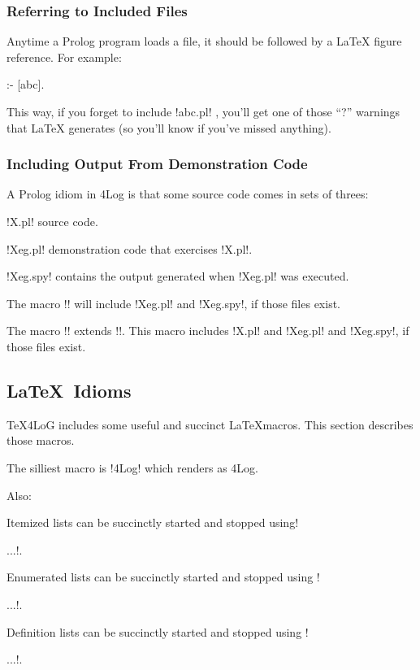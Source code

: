 \subsubsection{Referring to Included Files}

Anytime a Prolog program loads a file, it should be followed by a
{\LaTeX} figure reference. For example:
\newcommand{\bslash}{$\backslash$}

\bl
:- [abc]. %
\el

This way, if you forget to include !abc.pl! , you'll get one of those
``?'' warnings that {\LaTeX} generates (so you'll know if you've
missed anything).

\subsubsection{Including Output From Demonstration Code}

A Prolog idiom in \Tex4Log
is that some source code comes in sets of threes:
\be
\item !X.pl!
source code.
\item
  !Xeg.pl! demonstration code that exercises
!X.pl!.
\item
!Xeg.spy! contains the output generated when !Xeg.pl! was
executed.
\ee

The macro !! will include !Xeg.pl! and
!Xeg.spy!, if those files exist.

The macro !! extends !!.
This macro includes !X.pl! and
!Xeg.pl! and
!Xeg.spy!, if those files exist.



\subsection{\LaTeX~Idioms}

\TeX4LoG includes some useful and succinct \LaTeX macros. This
section describes those macros.

The silliest macro is  !\Tex4Log!
which renders as \Tex4Log.

Also:
\bi
\item
Itemized lists
 can be succinctly started and stopped using\newline !\bi\item...\ei!.
 \item
 Enumerated lists
 can be succinctly started and stopped using \newline
   !\be\item...\ee!.
    \item
  Definition lists can be succinctly started and stopped using \newline
!\bd\item...\ed!.
\ei

